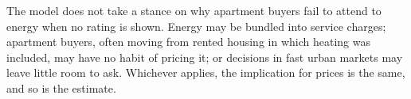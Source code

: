 The model does not take a stance on why apartment buyers fail to attend to energy when no rating is shown. Energy may be bundled into service charges; apartment buyers, often moving from rented housing in which heating was included, may have no habit of pricing it; or decisions in fast urban markets may leave little room to ask. Whichever applies, the implication for prices is the same, and so is the estimate.
